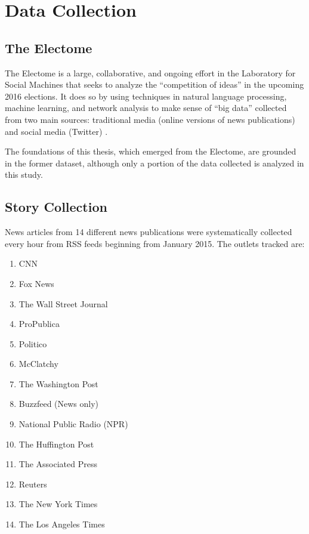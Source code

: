 \chapter{Data Collection}

\section{The Electome}

The Electome is a large, collaborative, and ongoing effort in the Laboratory for Social Machines that seeks to analyze the ``competition of ideas'' in the upcoming 2016 elections. It does so by using techniques in natural language processing, machine learning, and network analysis to make sense of ``big data'' collected from two main sources: traditional media (online versions of news publications) and social media (Twitter) \cite{vvr_electome2016}. 

The foundations of this thesis, which emerged from the Electome, are grounded in the former dataset, although only a portion of the data collected is analyzed in this study.

\section{Story Collection} 

News articles from 14 different news publications were systematically collected every hour from RSS feeds beginning from January 2015. The outlets tracked are:
 

\begin{multicols}{2}
    \begin{enumerate}
      \item CNN
      \item Fox News
      \item The Wall Street Journal
      \item ProPublica
      \item Politico
      \item McClatchy
      \item The Washington Post
      \item Buzzfeed (News only)
      \item National Public Radio (NPR)
      \item The Huffington Post
      \item The Associated Press
      \item Reuters
      \item The New York Times
      \item The Los Angeles Times
    \end{enumerate}
\end{multicols}

